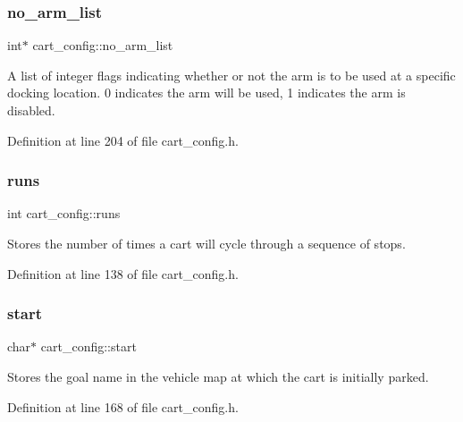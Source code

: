 \subsubsection{\texorpdfstring{no\+\_\+arm\+\_\+list}{no\_arm\_list}}
{\footnotesize\ttfamily int$\ast$ cart\+\_\+config\+::no\+\_\+arm\+\_\+list\hspace{0.3cm}{\ttfamily [private]}}

A list of integer flags indicating whether or not the arm is to be used at a specific docking location. 0 indicates the arm will be used, 1 indicates the arm is disabled. 

Definition at line 204 of file cart\+\_\+config.\+h.

\mbox{\label{classcart__config_a7ad70584604bd971e639efb74a1552ec}} 
\subsubsection{\texorpdfstring{runs}{runs}}
{\footnotesize\ttfamily int cart\+\_\+config\+::runs\hspace{0.3cm}{\ttfamily [private]}}

Stores the number of times a cart will cycle through a sequence of stops. 

Definition at line 138 of file cart\+\_\+config.\+h.

\mbox{\label{classcart__config_a353c41c44acad0ec6620f92d01942e7f}} 
\subsubsection{\texorpdfstring{start}{start}}
{\footnotesize\ttfamily char$\ast$ cart\+\_\+config\+::start\hspace{0.3cm}{\ttfamily [private]}}

Stores the goal name in the vehicle map at which the cart is initially parked. 

Definition at line 168 of file cart\+\_\+config.\+h.

\mbox{\label{classcart__config_a4bafa2b778c01f3648df8f24b24e59bb}} 

